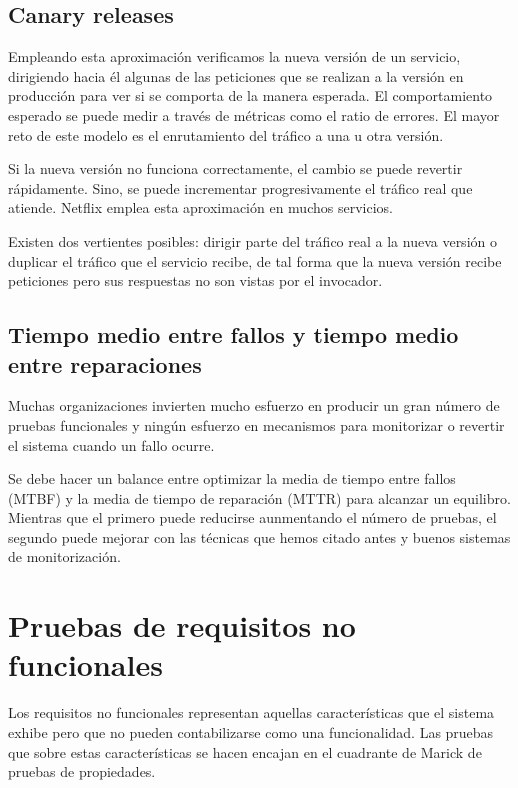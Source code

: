\documentclass[11pt,a4paper]{article}
\begin{document}
\subsection{Canary releases}

Empleando esta aproximación verificamos la nueva versión de un servicio, dirigiendo hacia él algunas de las peticiones que se realizan a la versión en producción para ver si se comporta de la manera esperada. El comportamiento esperado se puede medir a través de métricas como el ratio de errores. El mayor reto de este modelo es el enrutamiento del tráfico a una u otra versión.

Si la nueva versión no funciona correctamente, el cambio se puede revertir rápidamente. Sino, se puede incrementar progresivamente el tráfico real que atiende. Netflix emplea esta aproximación en muchos servicios.

Existen dos vertientes posibles: dirigir parte del tráfico real a la nueva versión o duplicar el tráfico que el servicio recibe, de tal forma que la nueva versión recibe peticiones pero sus respuestas no son vistas por el invocador.

\subsection{Tiempo medio entre fallos y tiempo medio entre reparaciones}

Muchas organizaciones invierten mucho esfuerzo en producir un gran número de pruebas funcionales y ningún esfuerzo en mecanismos para monitorizar o revertir el sistema cuando un fallo ocurre. 

Se debe hacer un balance entre optimizar la media de tiempo entre fallos (MTBF) y la media de tiempo de reparación (MTTR) para alcanzar un equilibro. Mientras que el primero puede reducirse aunmentando el número de pruebas, el segundo puede mejorar con las técnicas que hemos citado antes y buenos sistemas de monitorización.

\section{Pruebas de requisitos no funcionales}

Los requisitos no funcionales representan aquellas características que el sistema exhibe pero que no pueden contabilizarse como una funcionalidad. Las pruebas que sobre estas características se hacen encajan en el cuadrante de Marick de pruebas de propiedades. 
\end{document}
